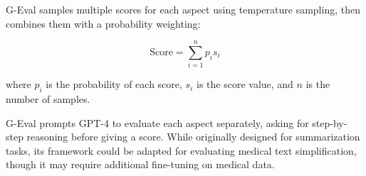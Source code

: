 G-Eval samples multiple scores for each aspect using temperature sampling, then combines them with a probability weighting:

\begin{equation}
   \text{Score} = \sum_{i=1}^{n} p_i s_i
\end{equation}

where $p_i$ is the probability of each score, $s_i$ is the score value, and $n$ is the number of samples.

G-Eval prompts GPT-4 to evaluate each aspect separately, asking for step-by-step reasoning before giving a score. 
While originally designed for summarization tasks, its framework could be adapted for evaluating medical text simplification, though it may require additional fine-tuning on medical data.

